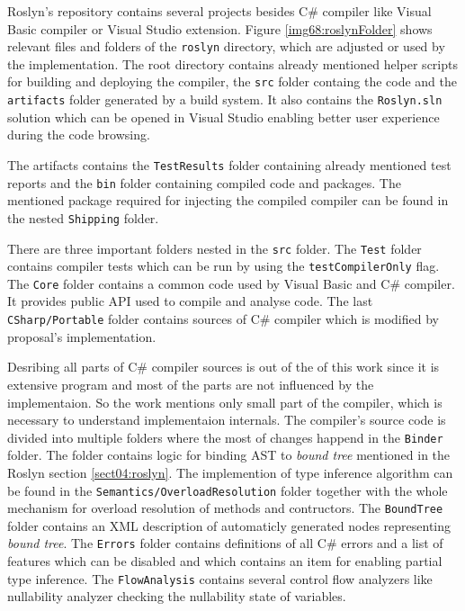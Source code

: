 Roslyn's repository contains several projects besides C\# compiler like Visual Basic compiler or Visual Studio extension.
Figure \ref{img68:roslynFolder} shows relevant files and folders of the \texttt{roslyn} directory, which are adjusted or used by the implementation.
The root directory contains already mentioned helper scripts for building and deploying the compiler, the \texttt{src} folder containg the code and the \texttt{artifacts} folder generated by a build system.
It also contains the \texttt{Roslyn.sln} solution which can be opened in Visual Studio enabling better user experience during the code browsing.
\par
The artifacts contains the \texttt{TestResults} folder containing already mentioned test reports and the \texttt{bin} folder containing compiled code and packages.
The mentioned package required for injecting the compiled compiler can be found in the nested \texttt{Shipping} folder.
\par
There are three important folders nested in the \texttt{src} folder.
The \texttt{Test} folder contains compiler tests which can be run by using the \texttt{testCompilerOnly} flag.
The \texttt{Core} folder contains a common code used by Visual Basic and C\# compiler.
It provides public API used to compile and analyse code.
The last \texttt{CSharp/Portable} folder contains sources of C\# compiler which is modified by proposal's implementation.
\par
Desribing all parts of C\# compiler sources is out of the of this work since it is extensive program and most of the parts are not influenced by the implementaion.
So the work mentions only small part of the compiler, which is necessary to understand implementaion internals.
The compiler's source code is divided into multiple folders where the most of changes happend in the \texttt{Binder} folder.
The folder contains logic for binding \ac{AST} to \textit{bound tree} mentioned in the Roslyn section \ref{sect04:roslyn}.
The implemention of type inference algorithm can be found in the \texttt{Semantics/OverloadResolution} folder together with the whole mechanism for overload resolution of methods and contructors.
The \texttt{BoundTree} folder contains an XML description of automaticly generated nodes representing \textit{bound tree}.
The \texttt{Errors} folder contains definitions of all C\# errors and a list of features which can be disabled and which contains an item for enabling partial type inference.
The \texttt{FlowAnalysis} contains several control flow analyzers like nullability analyzer checking the nullability state of variables.
